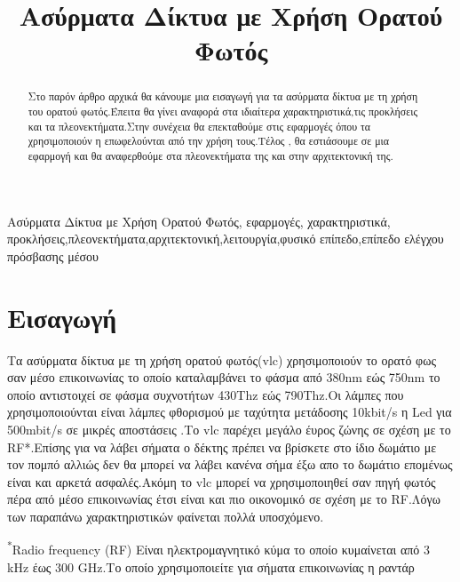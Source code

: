 \documentclass[conference]{IEEEtran}
\begin{document}
\title{Ασύρματα Δίκτυα με Χρήση Ορατού Φωτός\\}

\author{
}

\maketitle

\begin{abstract}
Στο παρόν άρθρο αρχικά θα κάνουμε μια εισαγωγή για τα ασύρματα δίκτυα με τη χρήση του ορατού φωτός.Έπειτα θα γίνει αναφορά στα ιδιαίτερα χαρακτηριστικά,τις προκλήσεις και  τα πλεονεκτήματα.Στην συνέχεια θα επεκταθούμε στις εφαρμογές όπου τα χρησιμοποιούν η επωφελούνται από την χρήση τους.Τέλος , θα εστιάσουμε σε μια εφαρμογή και θα αναφερθούμε στα πλεονεκτήματα της  και στην αρχιτεκτονική της.
\end{abstract}

\begin{IEEEkeywords}
 Ασύρματα Δίκτυα με Χρήση Ορατού Φωτός, εφαρμογές, χαρακτηριστικά, προκλήσεις,πλεονεκτήματα,αρχιτεκτονική,λειτουργία,φυσικό
επίπεδο,επίπεδο ελέγχου πρόσβασης μέσου
\end{IEEEkeywords}

\section{Εισαγωγή}

\cite{b1}Τα ασύρματα δίκτυα με τη χρήση ορατού φωτός(vlc) χρησιμοποιούν το ορατό φως  σαν μέσο επικοινωνίας το οποίο καταλαμβάνει το φάσμα από 380nm εώς 750nm το οποίο αντιστοιχεί σε φάσμα συχνοτήτων 430Thz εώς 790Thz.Οι λάμπες που χρησιμοποιούνται είναι λάμπες φθορισμού με ταχύτητα μετάδοσης 10kbit/s η Led για 500mbit/s σε μικρές αποστάσεις .Το vlc  παρέχει μεγάλο έυρος ζώνης σε σχέση με το RF*.Επίσης για να λάβει σήματα ο δέκτης πρέπει να βρίσκετε στο ίδιο δωμάτιο με τον πομπό  αλλιώς δεν  θα μπορεί να λάβει κανένα σήμα έξω απο το δωμάτιο επομένως είναι και αρκετά ασφαλές.Ακόμη το vlc μπορεί να χρησιμοποιηθεί σαν πηγή φωτός πέρα από μέσο επικοινωνίας έτσι είναι και πιο οικονομικό σε σχέση με το RF.Λόγω των παραπάνω χαρακτηριστικών φαίνεται πολλά υποσχόμενο.

{\footnotesize \textsuperscript{*}Radio frequency (RF) Eίναι  ηλεκτρομαγνητικό κύμα το οποίο κυμαίνεται από 3 kHz έως  300 GHz.Το οποίο χρησιμοποιείτε για σήματα επικοινωνίας η ραντάρ}
\end{document}
